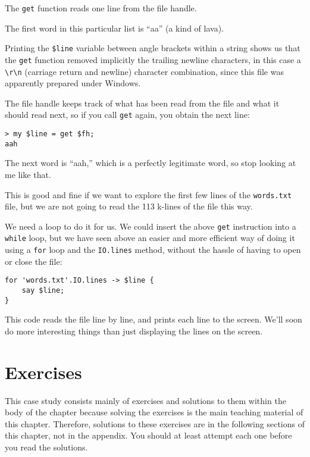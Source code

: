 The {\tt get} function reads one line from the file handle. 

The first word in this particular list is ``aa'' (a kind 
of lava).

Printing the \verb'$line' variable between angle brackets 
within a string shows us that the {\tt get} function removed 
implicitly the trailing newline characters, in this 
case a \verb'\r\n' (carriage return and newline) character 
combination, since this file was apparently prepared under 
Windows.

The file handle keeps track of what has been read from the 
file and what it should read next, so if you call {\tt get} 
again, you obtain the next line:

\begin{verbatim}
> my $line = get $fh;
aah
\end{verbatim}
%
The next word is ``aah,'' which is a perfectly legitimate
word, so stop looking at me like that.

This is good and fine if we want to explore the first few 
lines of the {\tt words.txt} file, but we are not going to 
read the 113 k-lines of the file this way.

We need a loop to do it for us. We could insert the above 
{\tt get} instruction into a {\tt while} loop, but we have 
seen above an easier and more efficient way of doing it 
using a {\tt for} loop and the {\tt IO.lines} method, 
without the hassle of having to open or close the file:

\begin{verbatim}
for 'words.txt'.IO.lines -> $line {
    say $line;
}
\end{verbatim}
%
This code reads the file line by line, and prints each line 
to the screen. We'll soon do more interesting things than 
just displaying the lines on the screen.

\section{Exercises}

This case study consists mainly of exercises and 
solutions to them within the body of the chapter because solving the 
exercises is the main teaching material of this chapter. Therefore, 
solutions to these exercises are in the following sections of 
this chapter, not in the appendix. You should at least 
attempt each one before you read the solutions.

